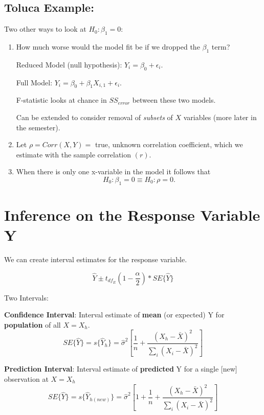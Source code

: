 \documentclass[12pt]{notes}
\begin{document}
\subsection*{Toluca Example:}

\begin{minipage}[l][2cm][c]{\textwidth}
\end{minipage}

Two other ways to look at $H_0: \beta_1 = 0:$

\begin{enumerate}
\item How much worse would the model fit be if we dropped the $\beta_1$ term?

Reduced Model (null hypothesis): $Y_i = \beta_0 + \epsilon_i$. 

Full Model: $Y_i = \beta_0 + \beta_1X_{i,1} + \epsilon_i$.

\nspace
F-statistic looks at chance in $SS_{error}$ between these two models. 

\nspace
Can be extended to consider removal of \textit{subsets} of $X$ variables (more later in the semester).  

\item Let $\rho = Corr(X,Y) = $ true, unknown correlation coefficient, which we estimate with the sample correlation $(r)$. 

\bi
\item When there is only one x-variable in the model it follows that 
\[H_0: \beta_1 = 0 \equiv H_0: \rho = 0.\]
\ei
\end{enumerate}

\section*{Inference on the Response Variable Y}
We can create interval estimates for the response variable. 

\[
\hat{Y} \pm t_{df_E}(1-\frac{\alpha}{2})*SE\{\hat{Y}\}
\]

Two Intervals:
\bi
\item \textbf{Confidence Interval}: Interval estimate of \textbf{mean} (or expected) Y for \textbf{population} of all $X = X_h.$
\[SE\{\hat{Y}\} = s\{\hat{Y}_h\} = \hat{\sigma}^2\left[\frac{1}{n} + \frac{(X_h - \bar{X})^2}{\sum_i (X_i - \bar{X})^2}\right]\]
\item \textbf{Prediction Interval}: Interval estimate of \textbf{predicted} Y for a single [new] observation at $X = X_h$
\[SE\{\hat{Y}\} = s\{\hat{Y}_{h (new)}\} = \hat{\sigma}^2\left[1 + \frac{1}{n} + \frac{(X_h - \bar{X})^2}{\sum_i (X_i - \bar{X})^2}\right]\]
\ei
\end{document}
